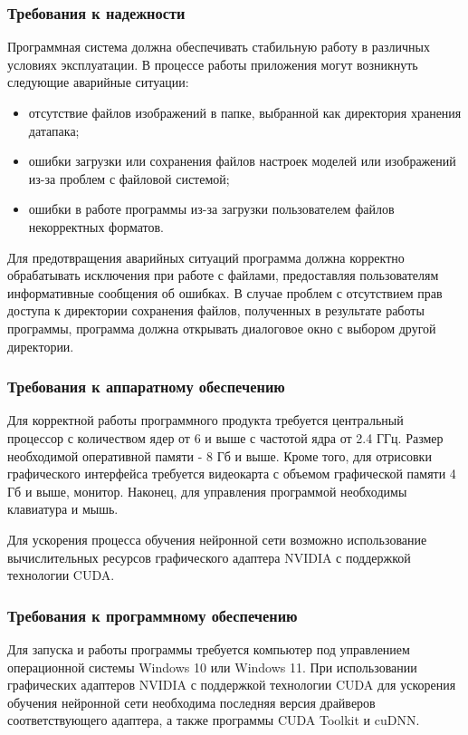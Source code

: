 \subsubsection{Требования к надежности}

Программная система должна обеспечивать стабильную работу в различных условиях эксплуатации. В процессе работы приложения могут возникнуть следующие аварийные ситуации:
\begin{itemize}
	\item отсутствие файлов изображений в папке, выбранной как директория хранения датапака;
	\item ошибки загрузки или сохранения файлов настроек моделей или изображений из-за проблем с файловой системой;
	\item ошибки в работе программы из-за загрузки пользователем файлов некорректных форматов.
\end{itemize} 

Для предотвращения аварийных ситуаций программа должна корректно обрабатывать исключения при работе с файлами, предоставляя пользователям информативные сообщения об ошибках. В случае проблем с отсутствием прав доступа к  директории сохранения файлов, полученных в результате работы программы, программа должна открывать диалоговое окно с выбором другой директории.

\subsubsection{Требования к аппаратному обеспечению}

Для корректной работы программного продукта требуется центральный процессор с количеством ядер от 6 и выше с частотой ядра от 2.4 ГГц. Размер необходимой оперативной памяти - 8 Гб и выше. Кроме того, для отрисовки графического интерфейса требуется видеокарта с объемом графической памяти 4 Гб и выше, монитор. Наконец, для управления программой необходимы клавиатура и мышь.

Для ускорения процесса обучения нейронной сети возможно использование вычислительных ресурсов графического адаптера NVIDIA с поддержкой технологии CUDA. 

\subsubsection{Требования к программному обеспечению}

Для запуска и работы программы требуется компьютер под управлением операционной системы Windows 10 или Windows 11. При использовании графических адаптеров NVIDIA с поддержкой технологии CUDA для ускорения обучения нейронной сети необходима последняя версия драйверов соответствующего адаптера, а также программы CUDA Toolkit и cuDNN.

